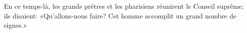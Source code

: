 En ce temps-là,
	les grands prêtres et les pharisiens réunirent le Conseil suprême;
	ils disaient: «Qu’allons-nous faire?
	Cet homme accomplit un grand nombre de signes.»
